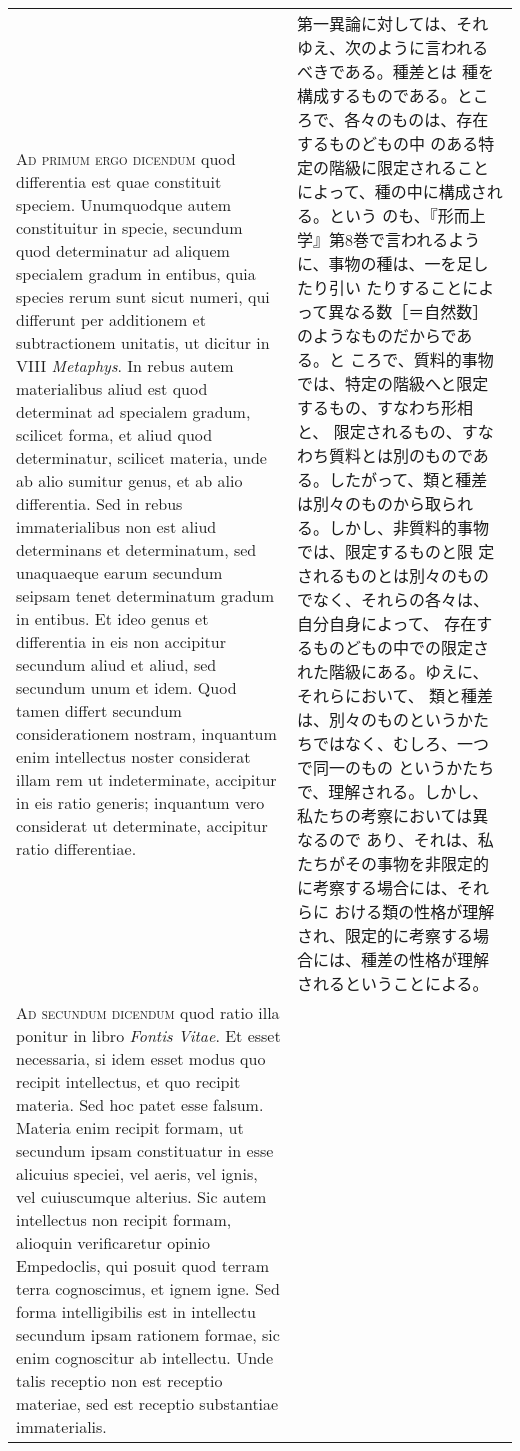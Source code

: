 \documentclass[10pt]{jsarticle} %
\begin{document}
\begin{longtable}{p{21em}p{21em}}
\\


 {\scshape Ad primum ergo dicendum} quod differentia est quae
 constituit speciem. Unumquodque autem constituitur in specie,
 secundum quod determinatur ad aliquem specialem gradum in entibus,
 quia species rerum sunt sicut numeri, qui differunt per additionem et
 subtractionem unitatis, ut dicitur in VIII {\itshape Metaphys}. In
 rebus autem materialibus aliud est quod determinat ad specialem
 gradum, scilicet forma, et aliud quod determinatur, scilicet materia,
 unde ab alio sumitur genus, et ab alio differentia. Sed in rebus
 immaterialibus non est aliud determinans et determinatum, sed
 unaquaeque earum secundum seipsam tenet determinatum gradum in
 entibus. Et ideo genus et differentia in eis non accipitur secundum
 aliud et aliud, sed secundum unum et idem. Quod tamen differt
 secundum considerationem nostram, inquantum enim intellectus noster
 considerat illam rem ut indeterminate, accipitur in eis ratio
 generis; inquantum vero considerat ut determinate, accipitur ratio
 differentiae.


&

 第一異論に対しては、それゆえ、次のように言われるべきである。種差とは
 種を構成するものである。ところで、各々のものは、存在するものどもの中
 のある特定の階級に限定されることによって、種の中に構成される。という
 のも、『形而上学』第8巻で言われるように、事物の種は、一を足したり引い
 たりすることによって異なる数［＝自然数］のようなものだからである。と
 ころで、質料的事物では、特定の階級へと限定するもの、すなわち形相と、
 限定されるもの、すなわち質料とは別のものである。したがって、類と種差
 は別々のものから取られる。しかし、非質料的事物では、限定するものと限
 定されるものとは別々のものでなく、それらの各々は、自分自身によって、
 存在するものどもの中での限定された階級にある。ゆえに、それらにおいて、
 類と種差は、別々のものというかたちではなく、むしろ、一つで同一のもの
 というかたちで、理解される。しかし、私たちの考察においては異なるので
 あり、それは、私たちがその事物を非限定的に考察する場合には、それらに
 おける類の性格が理解され、限定的に考察する場合には、種差の性格が理解
 されるということによる。



\\


{\scshape Ad secundum dicendum} quod ratio illa ponitur in libro
{\itshape Fontis Vitae}. Et esset necessaria, si idem esset modus quo
recipit intellectus, et quo recipit materia. Sed hoc patet esse
falsum. Materia enim recipit formam, ut secundum ipsam constituatur in
esse alicuius speciei, vel aeris, vel ignis, vel cuiuscumque
alterius. Sic autem intellectus non recipit formam, alioquin
verificaretur opinio Empedoclis, qui posuit quod terram terra
cognoscimus, et ignem igne. Sed forma intelligibilis est in intellectu
secundum ipsam rationem formae, sic enim cognoscitur ab
intellectu. Unde talis receptio non est receptio materiae, sed est
receptio substantiae immaterialis.



\end{longtable}
\end{document}

